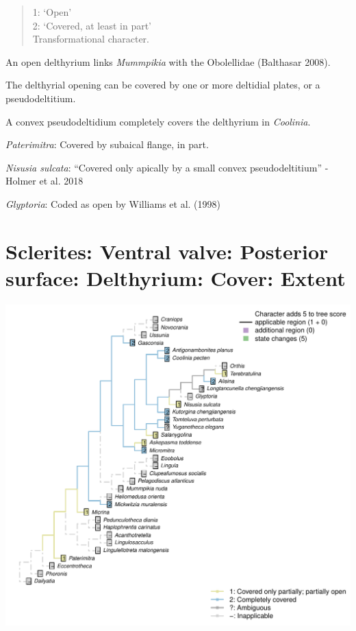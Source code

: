 \documentclass[]{book}
\theoremstyle{definition}
\theoremstyle{definition}
\theoremstyle{definition}
\theoremstyle{remark}
\begin{document}
\begin{quote}
1: `Open'\\
2: `Covered, at least in part'\\
Transformational character.
\end{quote}

An open delthyrium links \emph{Mummpikia} with the Obolellidae
(Balthasar 2008).

The delthyrial opening can be covered by one or more deltidial plates,
or a pseudodeltitium.

A convex pseudodeltidium completely covers the delthyrium in
\emph{Coolinia}.

\emph{Paterimitra}: Covered by subaical flange, in part.

\emph{Nisusia sulcata}: ``Covered only apically by a small convex
pseudodeltitium'' - Holmer et al. 2018

\emph{Glyptoria}: Coded as open by Williams et al. (1998)

\hypertarget{sclerites-ventral-valve-posterior-surface-delthyrium-cover-extent}{%
\section*{Sclerites: Ventral valve: Posterior surface: Delthyrium:
Cover:
Extent}\label{sclerites-ventral-valve-posterior-surface-delthyrium-cover-extent}}

\includegraphics{Brachiopod_phylogeny_files/figure-latex/unnamed-chunk-5-38.pdf}
\end{document}
